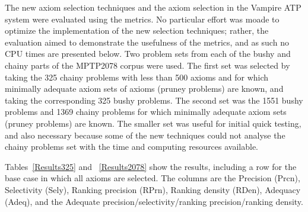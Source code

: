 \documentclass[]{ceurart}
\begin{document}
The new axiom selection techniques and the axiom selection in the Vampire 
ATP system were evaluated using the metrics.
No particular effort was moade to optimize the implementation of the new
selection techniques; rather, the evaluation aimed to demonstrate the
usefulness of the metrics, and as such no CPU times are presented below.
Two problem sets from each of the bushy and chainy parts of the MPTP2078 
corpus were used. 
The first set was selected by taking the 325 chainy problems with less than 
500 axioms and for which minimally adequate axiom sets of axioms (pruney 
problems) are known, and taking the corresponding 325 bushy problems.
The second set was the 1551 bushy problems and 1369 chainy problems for which
minimally adequate axiom sets (pruney problems) are known.
The smaller set was useful for initial quick testing, and also necessary 
because some of the new techniques could not analyse the chainy problems set 
with the time and computing resources available.

Tables~\ref{Results325} and ~\ref{Results2078} show the results, including
a row for the base case in which all axioms are selected.
The columns are the 
Precision (Prcn), 
Selectivity (Sely), 
Ranking precision (RPrn), 
Ranking density (RDen), 
Adequacy (Adeq),
and the Adequate precision/selectivity/ranking precision/ranking density.
\end{document}
